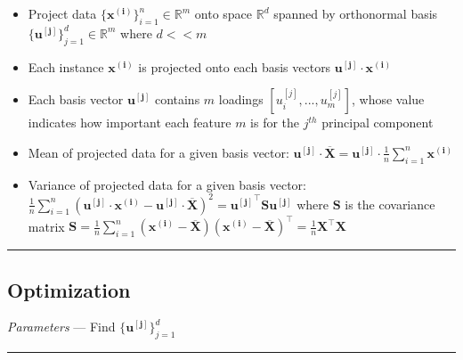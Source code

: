 \begin{itemize}
    \item Project data $\{\boldsymbol{x^{(i)}}\}_{i=1}^n \in \mathbb{R}^m$ onto space $\mathbb{R}^d$ spanned by orthonormal basis $\{\boldsymbol{u^{[j]}}\}_{j=1}^d \in \mathbb{R}^m$ where $d << m$
    \item Each instance $\boldsymbol{x^{(i)}}$ is projected onto each basis vectors $\boldsymbol{u^{[j]}} \cdot \boldsymbol{x^{(i)}}$
    \item Each basis vector $\boldsymbol{u^{[j]}}$ contains $m$ loadings $[u_i^{[j]}, ..., u_m^{[j]}]$, whose value indicates how important each feature $m$ is for the $j^{th}$ principal component
    \item Mean of projected data for a given basis vector: $\boldsymbol{u^{[j]}} \cdot \overline{\boldsymbol{X}} = \boldsymbol{u^{[j]}} \cdot \frac{1}{n} \sum_{i=1}^n \boldsymbol{x^{(i)}}$
    \item Variance of projected data for a given basis vector: $\frac{1}{n} \sum_{i=1}^n (\boldsymbol{u^{[j]}} \cdot \boldsymbol{x^{(i)}} - \boldsymbol{u^{[j]}} \cdot \overline{\boldsymbol{X}})^2 = \boldsymbol{u^{[j]}}^\intercal \boldsymbol{S} \boldsymbol{u^{[j]}}$ where $\boldsymbol{S}$ is the covariance matrix $\boldsymbol{S} = \frac{1}{n} \sum_{i=1}^n (\boldsymbol{x^{(i)}} - \overline{\boldsymbol{X}})(\boldsymbol{x^{(i)}} - \overline{\boldsymbol{X}})^\intercal = \frac{1}{n} \boldsymbol{X}^\intercal \boldsymbol{X}$
\end{itemize}

{\color{black}\hrule height 0.001mm}

\subsection*{Optimization}
\emph{Parameters} --- Find $\{\boldsymbol{u^{[j]}}\}_{j=1}^d$

{\color{lightgray}\hrule height 0.001mm}

